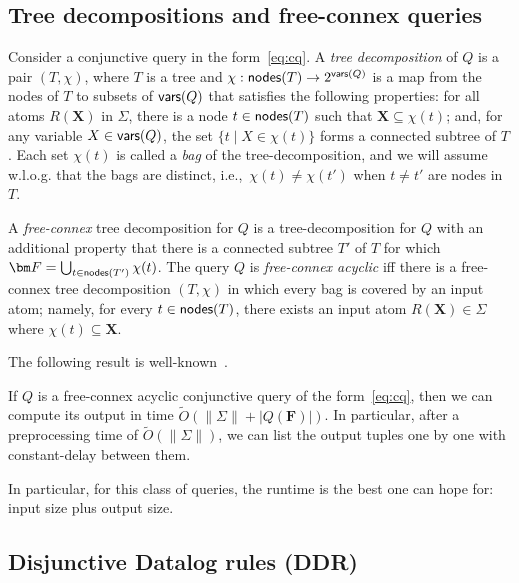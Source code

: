 \documentclass{theoretics}
\newcommand{\norm}[1]{\|#1\|}
\newcommand{\setof}[2]{\{{#1}\mid{#2}\}}        %
\newcommand{\vars}{\text{\sf vars}}
\newcommand{\nodes}{\text{\sf nodes}}
\begin{document}
\subsection{Tree decompositions and free-connex queries}
\label{subsec:td}

Consider a conjunctive query in the form~\eqref{eq:cq}. A {\em tree decomposition} of $Q$ is
a pair $(T,\chi)$, where $T$ is a tree and $\chi: \nodes(T) \rightarrow 2^{\vars(Q)}$ is a
map from the nodes of $T$ to subsets of $\vars(Q)$ that satisfies the following properties: for all atoms $R(\bm X)$ in $\Sigma$,
there is a node $t \in \nodes(T)$ such that $\bm X \subseteq \chi(t)$; and, for any variable
$X \in \vars(Q)$, the set $\setof{t}{X \in \chi(t)}$ forms a connected subtree of $T$. Each
set $\chi(t)$ is called a {\em bag} of the tree-decomposition, and we will assume w.l.o.g.
that the bags are distinct, i.e.,~$\chi(t)\neq\chi(t')$ when $t\neq t'$ are nodes in $T$.

A {\em free-connex} tree decomposition for $Q$ is a tree-decomposition for $Q$ with an
additional property that there is a connected subtree $T'$ of $T$ for which
$\bm F = \bigcup_{t \in \nodes(T')} \chi(t)$.
The query $Q$ is {\em free-connex acyclic} iff there is a free-connex tree decomposition
$(T, \chi)$ in which every bag is covered by an input atom;
namely, for every $t \in \nodes(T)$, there exists an input atom $R(\bm X) \in \Sigma$
where $\chi(t) \subseteq \bm X$.

The following result is
well-known~\cite{DBLP:conf/vldb/Yannakakis81,DBLP:conf/csl/BaganDG07}.

\begin{lemma}
    If $Q$ is a free-connex acyclic conjunctive query of the form~\eqref{eq:cq}, then we can compute
    its output in time $\tilde O(\norm{\Sigma} + |Q(\bm F)|)$.
    In particular, after a preprocessing time of $\tilde O(\norm{\Sigma})$, we can list the output tuples one by one with constant-delay between them.
    \label{lmm:free:connex:acyclic}
\end{lemma}

In particular, for this class of queries, the runtime is the best one can hope for: input
size plus output size.

\subsection{Disjunctive Datalog rules (DDR)}
\label{subsec:disjunctive}
\end{document}
